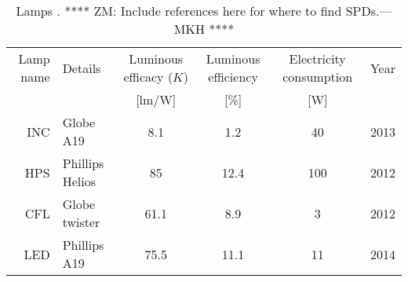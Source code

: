

\begin{table}
\centering %
\caption{Lamps  \cite{aube2013}. **** ZM: Include references here for where to find SPDs.---MKH ****}
\begin{tabular}{r l c c c c}
  \toprule
  Lamp name 
      & Details 
      & Luminous efficacy ($K$) 
      & Luminous efficiency
      & Electricity consumption 
      & Year  \\
  
      &
      & [lm/W]
      & [\%]
      & [W] 
      & \\
  \midrule
  INC
      & Globe A19
      & 8.1
      & 1.2
      & 40
      & 2013\\
  HPS   
      & Phillips Helios
      & 85
      & 12.4
      & 100
      & 2012 \\
  CFL
      & Globe twister
      & 61.1
      & 8.9
      & 3
      & 2012 \\
  LED
      & Phillips A19
      & 75.5
      & 11.1
      & 11
      & 2014 \\
  \bottomrule
\end{tabular}
\label{tab:lamps}
\end{table}

